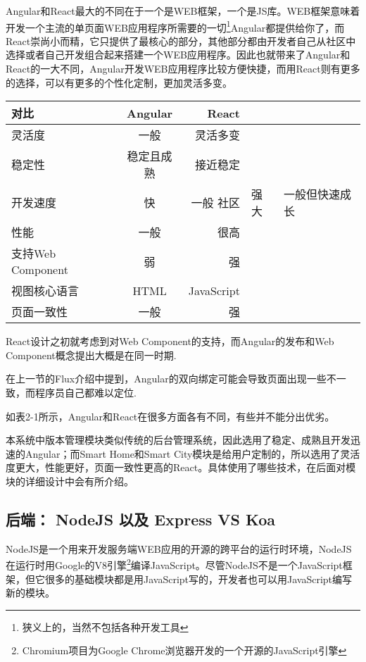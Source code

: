 Angular和React最大的不同在于一个是WEB框架，一个是JS库。WEB框架意味着开发一个主流的单页面WEB应用程序所需要的一切\footnote{狭义上的，当然不包括各种开发工具}Angular都提供给你了，而React崇尚小而精，它只提供了最核心的部分，其他部分都由开发者自己从社区中选择或者自己开发组合起来搭建一个WEB应用程序。因此也就带来了Angular和React的一大不同，Angular开发WEB应用程序比较方便快捷，而用React则有更多的选择，可以有更多的个性化定制，更加灵活多变。

\begin{table}[!htpb]
  \centering
  \begin{threeparttable}[b]
    \begin{tabular}{lcr}
      \toprule
      对比 & Angular & React \\
      \midrule
      灵活度 & 一般  & 灵活多变 \\
      稳定性 & 稳定且成熟  & 接近稳定 \\
      开发速度 & 快 & 一般
      社区    & 强大  & 一般但快速成长 \\
      性能 & 一般 & 很高 \\
      支持Web Component & 弱 & 强 \\
      视图核心语言 & HTML & JavaScript \\
      页面一致性 & 一般 & 强 \\
      \bottomrule
    \end{tabular}
    \begin{tablenotes}
    \item [1] React设计之初就考虑到对Web Component的支持，而Angular的发布和Web Component概念提出大概是在同一时期.
    \item [2] 在上一节的Flux介绍中提到，Angular的双向绑定可能会导致页面出现一些不一致，而程序员自己都难以定位.
    \end{tablenotes}
  \end{threeparttable}
\end{table}

如表2-1所示，Angular和React在很多方面各有不同，有些并不能分出优劣。

本系统中版本管理模块类似传统的后台管理系统，因此选用了稳定、成熟且开发迅速的Angular；而Smart Home和Smart City模块是给用户定制的，所以选用了灵活度更大，性能更好，页面一致性更高的React。具体使用了哪些技术，在后面对模块的详细设计中会有所介绍。

\subsection{后端： NodeJS 以及 Express VS Koa}
NodeJS是一个用来开发服务端WEB应用的开源的跨平台的运行时环境，NodeJS在运行时用Google的V8引擎\footnote{Chromium项目为Google Chrome浏览器开发的一个开源的JavaScript引擎}编译JavaScript。尽管NodeJS不是一个JavaScript框架，但它很多的基础模块都是用JavaScript写的，开发者也可以用JavaScript编写新的模块。

